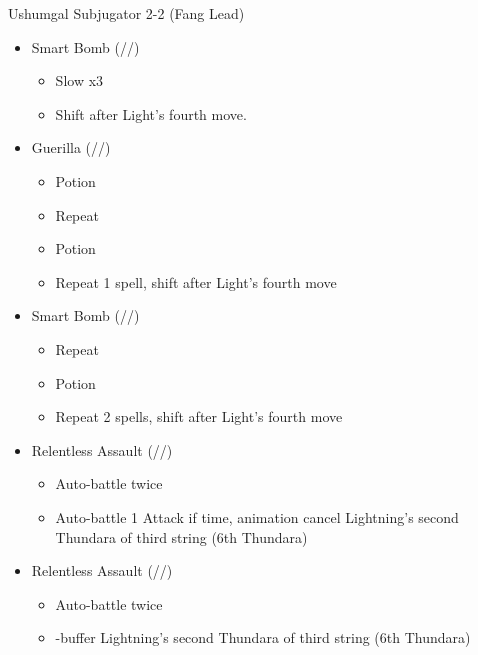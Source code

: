 \begin{multicols}{2}
  \renewcommand{\first}{[1] Aggression (\com/\com/\rav)}
  \renewcommand{\second}{[2] Relentless Assault (\com/\rav/\rav)}
  \renewcommand{\third}{[3] Smart Bomb (\sab/\rav/\rav)}
  \renewcommand{\fourth}{[4] Mystic Tower (\sen/\rav/\rav)}
  \renewcommand{\fifth}{[5] Guerilla (\sab/\rav/\syn)}
  \renewcommand{\sixth}{[6] Relentless Assault (\com/\rav/\rav)}

  \begin{battle}[2:21]{Ushumgal Subjugator 2-2 (Fang Lead)}
    \begin{itemize}
      \item \third
            \begin{itemize}
              \item Slow x3
              \item Shift after Light's fourth move.
            \end{itemize}
      \item \fifth
            \begin{itemize}
              \item Potion
              \item Repeat
              \item Potion
              \item Repeat 1 spell, shift after Light's fourth move
            \end{itemize}
      \item \third
            \begin{itemize}
              \item Repeat
              \item Potion
              \item Repeat 2 spells, shift after Light's fourth move
            \end{itemize}
      \item \second
            \begin{itemize}
              \item Auto-battle twice
              \item Auto-battle 1 Attack if time, animation cancel Lightning's second Thundara of third string (6th Thundara)
            \end{itemize}
      \item \sixth
            \begin{itemize}
              \item Auto-battle twice
              \item \com-buffer Lightning's second Thundara of third string (6th Thundara)

\end{itemize}
\end{itemize}
\end{battle}
\end{multicols}
